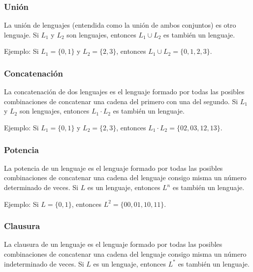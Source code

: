 \documentclass[11pt]{article}
\begin{document}
    \subsubsection{Unión}

    La unión de lenguajes (entendida como la unión de ambos conjuntos) es otro lenguaje. Si $L_1$ y $L_2$ son lenguajes, entonces $L_1 \cup L_2$ es también un lenguaje.

    Ejemplo: Si $L_1 = \{0, 1\}$ y $L_2 = \{2, 3\}$, entonces $L_1 \cup L_2 = \{0, 1, 2, 3\}$.

    \bigskip %

    \subsubsection{Concatenación}

    La concatenación de dos lenguajes es el lenguaje formado por todas las posibles combinaciones de concatenar una cadena del primero con una del segundo. Si $L_1$ y $L_2$ son lenguajes, entonces $L_1 \cdot L_2$ es también un lenguaje.

    Ejemplo: Si $L_1 = \{0, 1\}$ y $L_2 = \{2, 3\}$, entonces $L_1 \cdot L_2 = \{02, 03, 12, 13\}$.

    \bigskip %

    \subsubsection{Potencia}

    La potencia de un lenguaje es el lenguaje formado por todas las posibles combinaciones de concatenar una cadena del lenguaje consigo misma un número determinado de veces. Si $L$ es un lenguaje, entonces $L^n$ es también un lenguaje.

    Ejemplo: Si $L = \{0, 1\}$, entonces $L^2 = \{00, 01, 10, 11\}$.

    \bigskip %

    \subsubsection{Clausura}

    La clausura de un lenguaje es el lenguaje formado por todas las posibles combinaciones de concatenar una cadena del lenguaje consigo misma un número indeterminado de veces. Si $L$ es un lenguaje, entonces $L^{\ast}$ es también un lenguaje.
\end{document}
